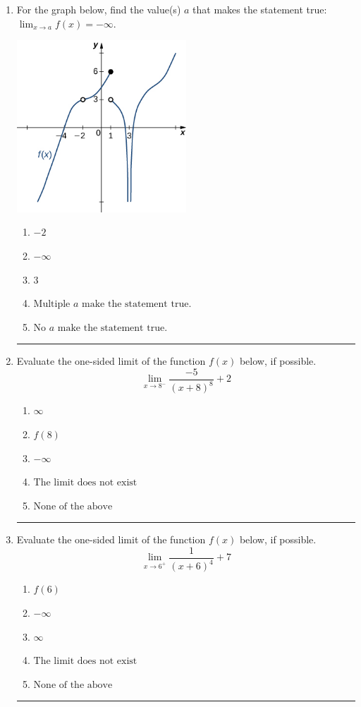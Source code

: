 \documentclass[14pt]{extbook}
\newcommand{\litem}[1]{\item#1\hspace*{-1cm}\rule{\textwidth}{0.4pt}}
\begin{document}
\begin{enumerate}
{\begin{enumerate}[label=\Alph*.]
\end{enumerate} }
\litem{
For the graph below, find the value(s) $a$ that makes the statement true: $ \displaystyle \lim_{x \rightarrow a} f(x) = -\infty$.
\begin{center}
    \includegraphics[width=0.5\textwidth]{../Figures/evaluateLimitGraphicallyB.png}
\end{center}
\begin{enumerate}[label=\Alph*.]
\item \( -2 \)
\item \( -\infty \)
\item \( 3 \)
\item \( \text{Multiple } a \text{ make the statement true}. \)
\item \( \text{No } a \text{ make the statement true}. \)

\end{enumerate} }
\litem{
Evaluate the one-sided limit of the function $f(x)$ below, if possible.\[ \lim_{x \rightarrow 8^-} \frac{-5}{(x+8)^8}+2 \]\begin{enumerate}[label=\Alph*.]
\item \( \infty \)
\item \( f(8) \)
\item \( -\infty \)
\item \( \text{The limit does not exist} \)
\item \( \text{None of the above} \)

\end{enumerate} }
\litem{
Evaluate the one-sided limit of the function $f(x)$ below, if possible.\[ \lim_{x \rightarrow 6^+} \frac{1}{(x+6)^4}+7 \]\begin{enumerate}[label=\Alph*.]
\item \( f(6) \)
\item \( -\infty \)
\item \( \infty \)
\item \( \text{The limit does not exist} \)
\item \( \text{None of the above} \)


\end{enumerate}}
\end{enumerate}
\end{document}
